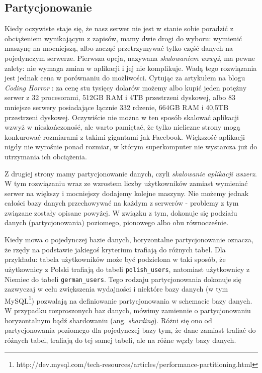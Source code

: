 \subsection{Partycjonowanie}
Kiedy oczywiste staje się, że nasz serwer nie jest w stanie sobie poradzić z obciążeniem wynikającym z zapisów, mamy dwie drogi do wyboru: wymienić maszynę na mocniejszą, albo zacząć przetrzymywać tylko część danych na pojedynczym serwerze.
Pierwsza opcja, nazywana \emph{skalowaniem wzwyż}, ma pewne zalety: nie wymaga zmian w aplikacji i jej nie komplikuje.
Wadą tego rozwiązania jest jednak cena w porównaniu do możliwości.
Cytując za artykułem na blogu \emph{Coding Horror} \cite{codinghorror-scaling-up-vs-out}: za cenę stu tysięcy dolarów możemy albo kupić jeden potężny serwer z 32 procesorami, 512GB RAM i 4TB przestrzeni dyskowej, albo 83 mniejsze serwery posiadające łącznie 332 rdzenie, 664GB RAM i 40,5TB przestrzeni dyskowej.
Oczywiście nie można w ten sposób skalować aplikacji wzwyż w nieskończoność, ale warto pamiętać, że tylko nieliczne strony mogą konkurować rozmiarami z takimi gigantami jak Facebook.
Większość aplikacji nigdy nie wyrośnie ponad rozmiar, w którym superkomputer nie wystarcza już do utrzymania ich obciążenia.


Z drugiej strony mamy partycjonowanie danych, czyli \emph{skalowanie aplikacji wszerz}.
W tym rozwiązaniu wraz ze wzrostem liczby użytkowników zamiast wymieniać serwer na większy i mocniejszy dodajemy kolejne maszyny.
Nie możemy jednak całości bazy danych przechowywać na każdym z serwerów - problemy z tym związane zostały opisane powyżej.
W związku z tym, dokonuje się podziału danych (partycjonowania) poziomego, pionowego albo obu równocześnie.

Kiedy mowa o pojedynczej bazie danych, horyzontalne partycjonowanie oznacza, że rzędy na podstawie jakiegoś kryterium trafiają do różnych tabel.
Dla przykładu: tabela użytkowników może być podzielona w taki sposób, że użytkownicy z Polski trafiają do tabeli \verb=polish_users=, natomiast użytkownicy z Niemiec do tabeli \verb=german_users=.
Tego rodzaju partycjonowania dokonuje się zazwyczaj w celu zwiększenia wydajności i niektóre bazy danych (w tym MySQL\footnote{http://dev.mysql.com/tech-resources/articles/performance-partitioning.html}) pozwalają na definiowanie partycjonowania w schemacie bazy danych.
W przypadku rozproszonych baz danych, mówimy zamiennie o partycjonowaniu horyzontalnym bądź shardowaniu (ang. \emph{sharding}).
Różni się ono od partycjonowania poziomego dla pojedynczej bazy tym, że dane zamiast trafiać do różnych tabel, trafiają do tej samej tabeli, ale na różne węzły bazy danych.

